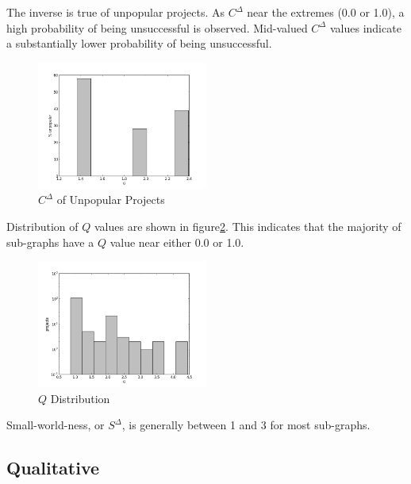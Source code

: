 \documentclass{proc}
\begin{document}
The inverse is true of unpopular projects. As $C^\Delta$ near the extremes (0.0 or 1.0), a high probability of being unsuccessful is observed. Mid-valued $C^\Delta$ values indicate a substantially lower probability of being unsuccessful.

\begin{figure}
\begin{center}
\includegraphics[width=0.5\textwidth]{images/freecode-unpopular.png}
\end{center}
\caption{$C^\Delta$ of Unpopular Projects}
\label{fig:cc_unpopular}
\end{figure}

Distribution of $Q$ values are shown in figure\ref{fig:q_distribution}. This indicates that the majority of sub-graphs have a $Q$ value near either 0.0 or 1.0. 


\begin{figure}
\begin{center}
\includegraphics[width=0.5\textwidth]{images/freecode-q-histo.png}
\end{center}
\caption{$Q$ Distribution}
\label{fig:q_distribution}
\end{figure}

Small-world-ness, or $S^\Delta$, is generally between 1 and 3 for most sub-graphs.


\subsection{Qualitative}
\end{document}
